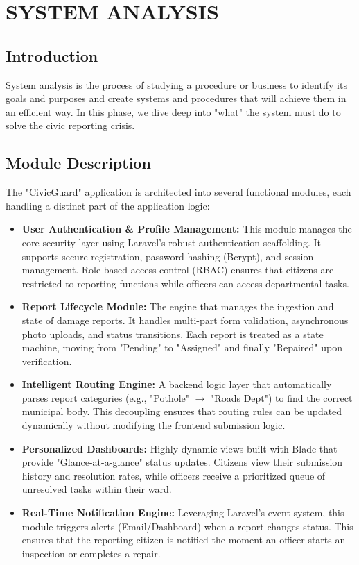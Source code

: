 \chapter{SYSTEM ANALYSIS}

\section{Introduction}
System analysis is the process of studying a procedure or business to identify its goals and purposes and create systems and procedures that will achieve them in an efficient way. In this phase, we dive deep into "what" the system must do to solve the civic reporting crisis.

\section{Module Description}
The "CivicGuard" application is architected into several functional modules, each handling a distinct part of the application logic:
\begin{itemize}
    \item \textbf{User Authentication \& Profile Management:} This module manages the core security layer using Laravel's robust authentication scaffolding. It supports secure registration, password hashing (Bcrypt), and session management. Role-based access control (RBAC) ensures that citizens are restricted to reporting functions while officers can access departmental tasks.
    \item \textbf{Report Lifecycle Module:} The engine that manages the ingestion and state of damage reports. It handles multi-part form validation, asynchronous photo uploads, and status transitions. Each report is treated as a state machine, moving from "Pending" to "Assigned" and finally "Repaired" upon verification.
    \item \textbf{Intelligent Routing Engine:} A backend logic layer that automatically parses report categories (e.g., "Pothole" $\rightarrow$ "Roads Dept") to find the correct municipal body. This decoupling ensures that routing rules can be updated dynamically without modifying the frontend submission logic.
    \item \textbf{Personalized Dashboards:} Highly dynamic views built with Blade that provide "Glance-at-a-glance" status updates. Citizens view their submission history and resolution rates, while officers receive a prioritized queue of unresolved tasks within their ward.
    \item \textbf{Real-Time Notification Engine:} Leveraging Laravel's event system, this module triggers alerts (Email/Dashboard) when a report changes status. This ensures that the reporting citizen is notified the moment an officer starts an inspection or completes a repair.
\end{itemize}

